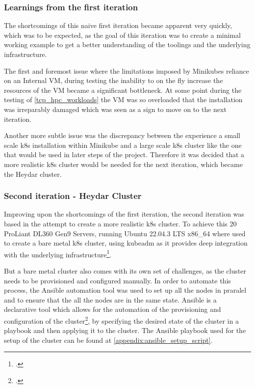 \subsubsection*{Learnings from the first iteration}

The shortcomings of this naive first iteration became apparent very quickly, 
which was to be expected, as the goal of this iteration was to create a minimal working example to get a better understanding of the toolings and the underlying infrastructure.

The first and foremost issue where the limitations imposed by Minikubes reliance on an Internal \ac{VM},
during testing the inability to on the fly increase the resources of the \ac{VM} became a significant bottleneck.
At some point during the testing of \ref{tcp_hpc_workloads} the \ac{VM} was so overloaded that the installation was irreparably damaged which was seen as a sign to move on to the next iteration.

Another more subtle issue was the discrepancy between the experience a small scale \ac{k8s} installation within Minikube and a large scale \ac{k8s} cluster like the one that would be used in later steps of the project.
Therefore it was decided that a more realistic \ac{k8s} cluster would be needed for the next iteration, which became the Heydar cluster.

\subsubsection{Second iteration - Heydar Cluster}
\label{heydar_cluster}

Improving upon the shortcomings of the first iteration, the second iteration was based in the attempt to create a more realistic \ac{k8s} cluster.
To achieve this 20 ProLiant DL360 Gen9 Servers, running Ubuntu 22.04.3 LTS x86\_64 where used to create a bare metal \ac{k8s} cluster,
using kubeadm as it provides deep integration with the underlying infrastructure\footcite{CreatingClusterKubeadm}.

But a bare metal cluster also comes with its own set of challenges, as the cluster needs to be provisioned and configured manually.
In order to automate this process, the Ansible automation tool was used to set up all the nodes in praralel and to ensure that the all the nodes are in the same state.
Ansible is a declarative tool which allows for the automation of the provisioning and configuration of the cluster\footcite{Ansible2023}, by specifying the desired state of the cluster in a playbook and then applying it to the cluster.
The Ansible playbook used for the setup of the cluster can be found at \ref{appendix:ansible_setup_script}.


